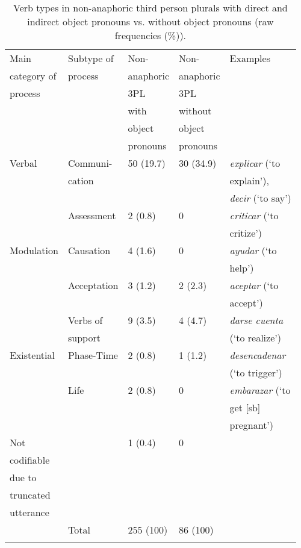 \documentclass[output=paper]{langscibook}
\begin{document}
\begin{table}
\begin{tabular}{lllll}

\lsptoprule
 Main &  Subtype of &  Non- &  Non- &  Examples\\
{category of} & {process} & {anaphoric} & {anaphoric} &\\
{process} & & {3PL} & {3PL} &\\
& & {with} & {without} & \\
& & {object} & {object} &\\
& & {pronouns} & {pronouns} &\\
\midrule
{Verbal}  & Communi- & 50 (19.7) & 30 (34.9) & \textit{explicar} (‘to\\
& cation & & & explain’),\\
& & & & \textit{decir} (‘to say’)\\
&  Assessment  &  2 (0.8) &  0 & \textit{criticar} (‘to\\
& & & &  critize’)\\
\midrule
{Modulation}  &  Causation  &  4 (1.6) &  0 & \textit{ayudar} (‘to\\
& & & & help’)\\
&  Acceptation &  3 (1.2) &  2 (2.3) & \textit{aceptar} (‘to\\
& & & & accept’)\\
&  Verbs of &  9 (3.5) &  4 (4.7) & \textit{darse cuenta}\\
& support & & &  (‘to realize’)\\
\midrule
Existential &  Phase-Time  &  2 (0.8) &  1 (1.2) & \textit{desencadenar}\\
& & & & (‘to trigger’)\\

&  Life  &  2 (0.8) &  0 & \textit{embarazar} (‘to\\
& & & & get [sb]\\
& & & & pregnant’)\\
\midrule
{Not}  &  &  1 (0.4) &  0 & \\
{codifiable} & & & &\\
{due} {to} & & & &\\
{truncated} & & & &\\
{utterance} & & & &\\
\midrule
&  Total  &  255 (100) &  86 (100) & \\
\lspbottomrule
\end{tabular}
\caption{Verb types in non-anaphoric third person plurals with direct and indirect object pronouns vs.  without object pronouns (raw frequencies (\%)).}
\label{tab:pierre:3}
\end{table} %
\end{document}
